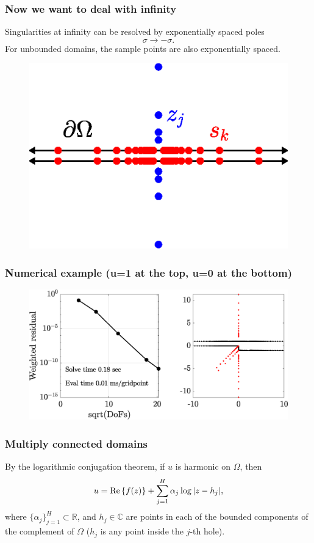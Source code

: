\begin{frame}
\frametitle{Now we want to deal with infinity}
\bigskip
Singularities at infinity can be resolved by exponentially spaced poles 
\begin{equation*}
\sigma\to -\sigma.
\end{equation*}
For unbounded domains, the sample points are also exponentially spaced.
\begin{figure}
	\includegraphics[height=0.45\linewidth]{Figures/cluster2}
\end{figure}
\end{frame}

\begin{frame}
\frametitle{Numerical example (u=1 at the top, u=0 at the bottom)}
\centering
\begin{figure}
	\vfill
	\includegraphics[height=0.3\linewidth]{Figures/lapchan_conv}
\end{figure}
\end{frame}


\begin{frame}
\frametitle{Multiply connected domains}
By the logarithmic conjugation theorem, if $u$ is harmonic on $\Omega$, then
\begin{equation*}
u = \Re\left\{f(z)\right\} + \sum_{j=1}^H \alpha_j \log\abs{z-h_j},
\end{equation*}
where $\{\alpha_j\}_{j=1}^H\subset\mathbb{R}$, and $h_j\in \mathbb{C}$ are points in each of the bounded components of the complement of $\Omega$ ($h_j$ is any point inside the $j$-th hole).
\end{frame}